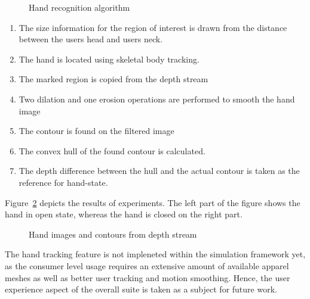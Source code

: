 \begin{figure}[h]
\centerline{}
\caption{Hand recognition algorithm}
\label{fig:hand_recognition_cycle}
\end{figure} 

\begin{enumerate}
\item The size information for the region of interest is drawn from the distance between the users head and users neck.
\item The hand is located using skeletal body tracking.
\item The marked region is copied from the depth stream 
\item Two dilation and one erosion operations are performed to smooth the hand image
\item The contour is found on the filtered image
\item The convex hull of the found contour is calculated.
\item The depth difference between the hull and the actual contour is taken as the reference for hand-state.
\end{enumerate}

Figure~\ref{fig:open_closed_hands} depicts the results of experiments. The left part of the figure shows the hand in open state, whereas the hand is closed on the right part.

\begin{figure}[h]
\centerline{}
\caption{Hand images and contours from depth stream}
\label{fig:open_closed_hands}
\end{figure}

The hand tracking feature is not impleneted within the simulation framework yet, as the consumer level usage requires an extensive amount of available apparel meshes as well as better user tracking and motion smoothing. Hence, the user experience aspect of the overall suite is taken as a subject for future work.

